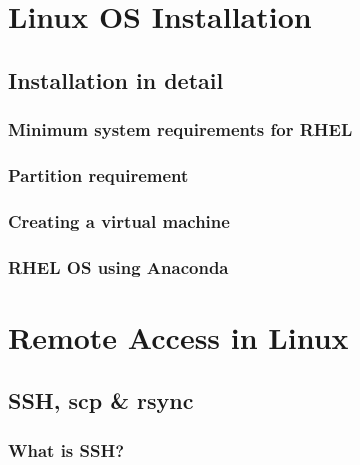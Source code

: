 \documentclass[14pt,fleqn]{extbook} %
\begin{document}
\chapter{Linux OS Installation}
\section{Installation in detail}

\subsection{Minimum system requirements for RHEL}

\subsection{Partition requirement}

\subsection{Creating a virtual machine}

\subsection{RHEL OS using Anaconda}

\chapter{Remote Access in Linux}
\section{SSH, scp \& rsync}

\subsection{What is SSH?}

\end{document}
